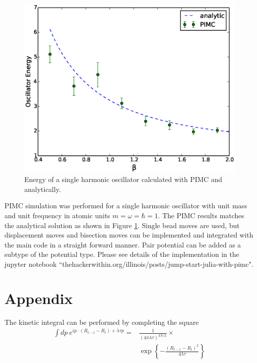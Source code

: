 \documentclass[prl,reprint]{revtex4-1}
\begin{document}
\begin{figure}[h]
\centering
\includegraphics[scale=.4]{figures/single-harmonic}
\caption{Energy of a single harmonic oscillator calculated with PIMC and analytically.\label{fig:single-harmonic}}
\end{figure}

PIMC simulation was performed for a single harmonic oscillator with unit mass and unit frequency in atomic units $m=\omega=\hbar=1$. The PIMC results matches the analytical solution as shown in Figure \ref{fig:single-harmonic}. Single bead moves are used, but displacement moves and bisection moves can be implemented and integrated with the main code in a straight forward manner. Pair potential can be added as a subtype of the potential type. Please see details of the implementation in the jupyter notebook ``thehackerwithin.org/illinois/posts/jump-start-julia-with-pimc".

\section{Appendix}
The kinetic integral can be performed by completing the square
\begin{align*}
\int dp~e^{ip\cdot(R_{t-1}-R_t)+\lambda\tau p} =& \frac{1}{(4\pi\lambda\tau)^{3N/2}}\times \\
&\exp\left\{-\frac{(R_{t-1}-R_t)^2}{4\lambda\tau}\right\}
\end{align*}



\end{document}

